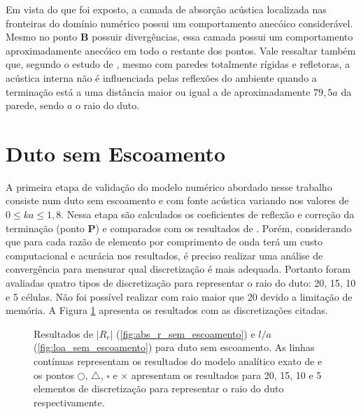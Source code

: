 Em vista do que foi exposto, a camada de absorção acústica localizada nas fronteiras do domínio numérico
 possui um comportamento anecóico considerável. Mesmo no ponto \textbf{B} possuir divergências, 
 essa camada possui um comportamento aproximadamente anecóico em todo o restante dos pontos.
 Vale ressaltar também que, segundo o estudo de , 
 mesmo com paredes totalmente rígidas e refletoras, a acústica interna não é influenciada pelas reflexões do ambiente quando a terminação está a uma distância maior ou igual a de aproximadamente $79,5a$ da parede, sendo $a$ o raio do duto.  

\newpage
\section{Duto sem Escoamento}

A primeira etapa de validação do modelo numérico abordado nesse trabalho consiste num duto sem escoamento e com fonte acústica variando nos valores de $0 \leq ka \leq 1,8$. Nessa etapa são calculados os coeficientes de reflexão e correção da terminação (ponto \textbf{P}) e comparados com os resultados de . Porém, considerando que para cada razão de elemento por comprimento de onda terá um custo computacional e acurácia nos resultados, é preciso realizar uma análise de convergência para mensurar qual discretização é mais adequada. Portanto foram avaliadas quatro tipos de discretização para representar o raio do duto: 20, 15, 10 e 5 células. Não foi possível realizar com raio maior que 20 devido a limitação de memória. A Figura \ref{fig:resultados_sem_escoamento} apresenta os resultados com as discretizações citadas.

\begin{figure}[h!]
\begin{subfigure}{\scaleA \textwidth}
  
\end{subfigure}%
\begin{subfigure}{\scaleA \textwidth}
  
\end{subfigure}
\caption[Resultados de $|R_{r}|$ e $l/a$ sem escoamento]{Resultados de $|R_{r}|$ (\ref{fig:abs_r_sem_escoamento}) e $l/a$ (\ref{fig:loa_sem_escoamento}) para duto sem escoamento. As linhas contínuas representam os resultados do modelo analítico exato de  e os pontos $\bigcirc$, $\bigtriangleup$, $\square$ e $\times$ apresentam os resultados para 20, 15, 10 e 5 elementos de discretização para representar o raio do duto respectivamente.}
\label{fig:resultados_sem_escoamento}
\end{figure}

